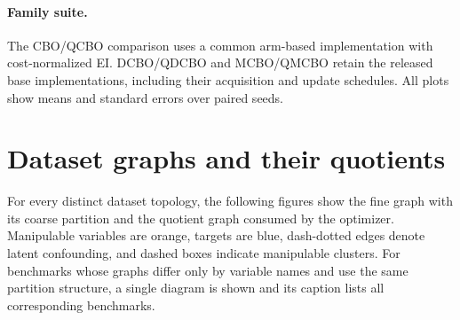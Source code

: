 \documentclass[twoside]{article}
\begin{document}
\paragraph{Family suite.} The CBO/QCBO comparison uses a common arm-based implementation with cost-normalized EI. DCBO/QDCBO and MCBO/QMCBO retain the released base implementations, including their acquisition and update schedules. All plots show means and standard errors over paired seeds.

\section{Dataset graphs and their quotients}
\label{app:dags}

For every distinct dataset topology, the following figures show the fine graph with its coarse partition and the quotient graph consumed by the optimizer. Manipulable variables are orange, targets are blue, dash-dotted edges denote latent confounding, and dashed boxes indicate manipulable clusters. For benchmarks whose graphs differ only by variable names and use the same partition structure, a single diagram is shown and its caption lists all corresponding benchmarks.

\begingroup
\let\savedfigure\figure
\let\endsavedfigure\endfigure
\renewenvironment{figure}[1][]{\savedfigure[H]}{\endsavedfigure}

\endgroup
\clearpage
\end{document}

